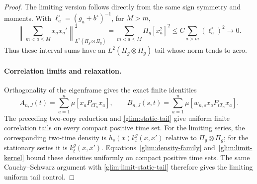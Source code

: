 \begin{proof}
The limiting version follows directly from the same sign symmetry
and moments.  With \(\ell_a^\circ=(g_a+b^\circ)^{-1}\), for \(M>m\),
\begin{equation}
 \left\|\sum_{m<a\le M}x_a x_a'\right\|_{L^2(\Pi_g\otimes\Pi_g)}^2
 =\sum_{m<a\le M}\Pi_g[x_a^2]^2
 \le C\sum_{a>m}(\ell_a^\circ)^2\longrightarrow0.
 \label{glim:limit-static-tail}
\end{equation}
Thus these interval sums have an \(L^2(\Pi_g\otimes\Pi_g)\) tail
whose norm tends to zero.

\paragraph{Correlation limits and relaxation.}
Orthogonality of the eigenframe gives the exact finite identities
\[
 A_{n,J}(t)=\sum_{a=1}^n\mu[x_aP_{tT_n}x_a],\qquad
 B_{n,J}(s,t)=\sum_{a=1}^n\mu[w_{n,s}x_aP_{tT_n}x_a].
\]
The preceding two-copy reduction and \eqref{glim:static-tail} give
uniform finite correlation tails on every compact positive time set.
For the limiting series, the corresponding two-time density is
\(h_s(x)k_t^g(x,x')\) relative to \(\Pi_g\otimes\Pi_g\);
for the stationary series it is \(k_t^g(x,x')\).
Equations~\eqref{glim:density-family} and~\eqref{glim:limit-kernel}
bound these densities uniformly on compact positive time sets.
The same Cauchy--Schwarz argument with
\eqref{glim:limit-static-tail} therefore gives the limiting uniform
tail control.


\end{proof}
